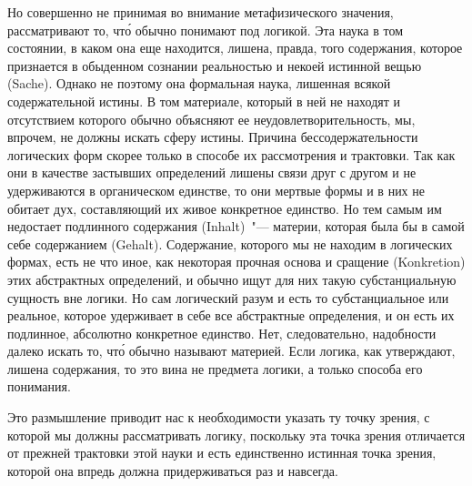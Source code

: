 
Но совершенно не принимая во внимание метафизического
значения, рассматривают то, чт\'о обычно понимают
под логикой. Эта наука в том состоянии, в каком
она еще находится, лишена, правда, того содержания,
которое признается в обыденном сознании реальностью
и некоей истинной вещью (Sache). Однако не поэтому
она формальная наука, лишенная всякой содержательной
истины. В том материале, который в ней не находят и
отсутствием которого обычно объясняют ее неудовлетворительность,
мы, впрочем, не должны искать сферу истины.
Причина бессодержательности логических форм
скорее только в способе их рассмотрения и трактовки.
Так как они в качестве застывших определений лишены
связи друг с другом и не удерживаются в органическом
единстве, то они мертвые формы и в них не обитает дух,
составляющий их живое конкретное единство. Но тем
самым им недостает подлинного содержания (Inhalt)~"---
материи, которая была бы в самой себе содержанием
(Gehalt). Содержание, которого мы не находим в логических
формах, есть не что иное, как некоторая прочная
основа и сращение (Konkretion) этих абстрактных определений,
и обычно ищут для них такую субстанциальную
сущность вне логики. Но сам логический разум и
есть то субстанциальное или реальное, которое удерживает
в себе все абстрактные определения, и он есть
их подлинное, абсолютно конкретное единство. Нет,
следовательно, надобности далеко искать то, чт\'о обычно
называют материей. Если логика, как утверждают, лишена
содержания, то это вина не предмета логики, а только
способа его понимания.

Это размышление приводит нас к необходимости указать
ту точку зрения, с которой мы должны рассматривать
логику, поскольку эта точка зрения отличается от
прежней трактовки этой науки и есть единственно истинная
точка зрения, которой она впредь должна придерживаться
раз и навсегда.

